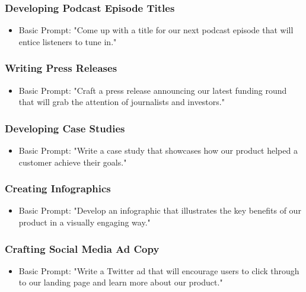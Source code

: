 \begin{frame}[fragile]\frametitle{Developing Podcast Episode Titles}
\begin{itemize}
\item Basic Prompt: "Come up with a title for our next podcast episode that will entice listeners to tune in."
\end{itemize}
\end{frame}

\begin{frame}[fragile]\frametitle{Writing Press Releases}
\begin{itemize}
\item Basic Prompt: "Craft a press release announcing our latest funding round that will grab the attention of journalists and investors."
\end{itemize}
\end{frame}

\begin{frame}[fragile]\frametitle{Developing Case Studies}
\begin{itemize}
\item Basic Prompt: "Write a case study that showcases how our product helped a customer achieve their goals."
\end{itemize}
\end{frame}

\begin{frame}[fragile]\frametitle{Creating Infographics}
\begin{itemize}
\item Basic Prompt: "Develop an infographic that illustrates the key benefits of our product in a visually engaging way."
\end{itemize}
\end{frame}

\begin{frame}[fragile]\frametitle{Crafting Social Media Ad Copy}
\begin{itemize}
\item Basic Prompt: "Write a Twitter ad that will encourage users to click through to our landing page and learn more about our product."
\end{itemize}
\end{frame}

